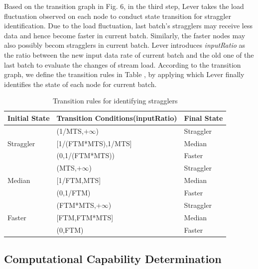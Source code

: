 \documentclass[10pt,conference,compsocconf,letterpaper]{IEEEtran}
\begin{document}
  Based on the transition graph in Fig. 6, in the third step, Lever takes the load fluctuation observed on each node to conduct state transition for straggler identification. Due to the load fluctuation, last batch's stragglers may receive less data and hence become faster in current batch. Similarly, the faster nodes may also possibly becom stragglers in current batch. Lever introduces \emph{inputRatio} as the ratio between the new input data rate of current batch and the old one of the last batch to evaluate the changes of stream load. According to the transition graph, we define the transition rules in Table \uppercase\expandafter{}, by applying which Lever finally identifies the state of each node for current batch.
  \begin{table}[htbp]
    \footnotesize
    \centering
    \caption{Transition rules for identifying stragglers}
    \begin{threeparttable}
    \centering
      \begin{tabular}{|p{1.5cm}|p{4.3cm}|p{1.4cm}|}
        \hline
        Initial State & Transition Conditions(inputRatio) & Final State \\
        \hline
        \multirow{3}{2cm}{Straggler} &
        (1/MTS,$+\infty$) & Straggler \\
        \cline{2-3}
        & [1/(FTM*MTS),1/MTS] & Median \\
        \cline{2-3}
        & (0,1/(FTM*MTS)) & Faster \\
        \hline
        \multirow{3}{2cm}{Median} &
        (MTS,$+\infty$) & Straggler \\
        \cline{2-3}
        & [1/FTM,MTS] & Median \\
        \cline{2-3}
        & (0,1/FTM) & Faster \\
        \hline
        \multirow{3}{2cm}{Faster} &
        (FTM*MTS,$+\infty$) & Straggler \\
        \cline{2-3}
        & [FTM,FTM*MTS] & Median \\
        \cline{2-3}
        & (0,FTM) & Faster \\
        \hline
      \end{tabular}
    \end{threeparttable}
    \label{Table1}
  \end{table}

\subsection{Computational Capability Determination}
\end{document}
